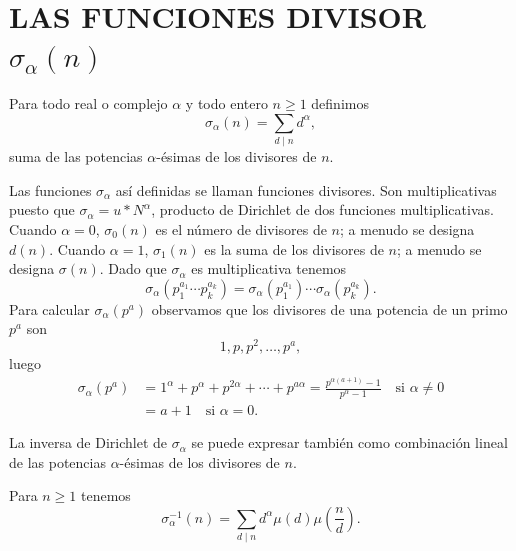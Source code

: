 \documentclass[12pt,a4paper]{book}
\begin{document}
    \section{LAS FUNCIONES DIVISOR \texorpdfstring{$\sigma_\alpha(n)$}{σα(n)}}

    \begin{definicion}
        Para todo real o complejo $\alpha$ y todo entero $n\geq1$ definimos
        \begin{equation*}
            \sigma_\alpha(n)=\sum_{d\mid n}d^\alpha,
        \end{equation*}
        suma de las potencias $\alpha$-ésimas de los divisores de $n$.
    \end{definicion}

    Las funciones $\sigma_\alpha$ así definidas se llaman funciones divisores. Son
    multiplicativas puesto que $\sigma_\alpha=u*N^\alpha$, producto de Dirichlet de dos
    funciones multiplicativas. Cuando $\alpha=0$, $\sigma_0(n)$ es el número de divisores
    de $n$; a menudo se designa $d(n)$. Cuando $\alpha=1$, $\sigma_1(n)$ es la suma de los
    divisores de $n$; a menudo se designa $\sigma(n)$. Dado que $\sigma_\alpha$ es
    multiplicativa tenemos
    \begin{equation*}
        \sigma_\alpha(p_1^{a_1}\cdots p_k^{a_k})=\sigma_\alpha(p_1^{a_1})\cdots\sigma_\alpha(p_k^{a_k}).
    \end{equation*}
    Para calcular $\sigma_\alpha(p^a)$ observamos que los divisores de una potencia de un
    primo $p^a$ son
    \begin{equation*}
        1,p,p^2,\dots,p^a,
    \end{equation*}
    luego
    \begin{align*}
        \sigma_\alpha(p^a)&=1^\alpha+p^\alpha+p^{2\alpha}+\cdots+p^{a\alpha}
        =\frac{p^{\alpha(a+1)}-1}{p^\alpha-1}\quad\text{si } \alpha\neq0\\
        &=a+1\quad\text{si } \alpha=0.
    \end{align*}

    La inversa de Dirichlet de $\sigma_\alpha$ se puede expresar también como combinación
    lineal de las potencias $\alpha$-ésimas de los divisores de $n$.

    \begin{teorema}
        Para $n\geq1$ tenemos
        \begin{equation*}
            \sigma_\alpha^{-1}(n)=\sum_{d\mid n}d^\alpha\mu(d)\mu\left(\frac{n}{d}\right).
        \end{equation*}
    \end{teorema}
\end{document}
